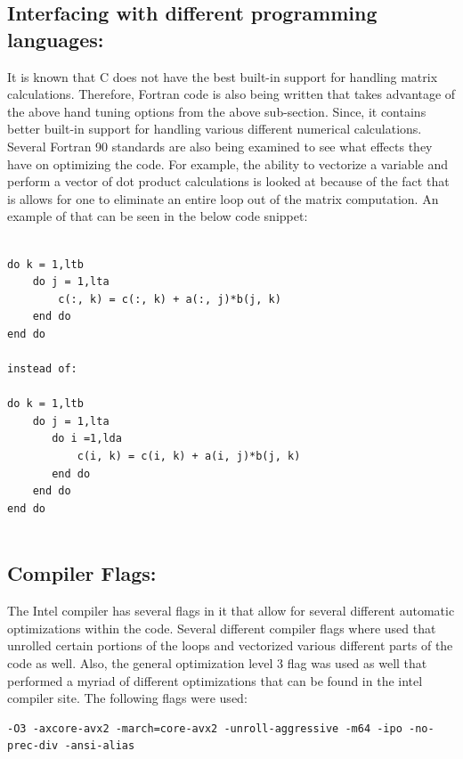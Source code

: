 \documentclass{article}
\begin{document}
\subsection*{Interfacing with different programming languages:}

It is known that C does not have the best built-in support for handling matrix calculations. Therefore, Fortran code is also being written that takes advantage of the above hand tuning options from the above sub-section. Since, it contains better built-in support for handling various different numerical calculations. Several Fortran 90 standards are also being examined to see what effects they have on optimizing the code. For example, the ability to vectorize a variable and perform a vector of dot product calculations is looked at because of the fact that is allows for one to eliminate an entire loop out of the matrix computation. An example of that can be seen in the below code snippet:
\begin{verbatim}

do k = 1,ltb
    do j = 1,lta
        c(:, k) = c(:, k) + a(:, j)*b(j, k)
    end do
end do

instead of:

do k = 1,ltb
    do j = 1,lta
       do i =1,lda
           c(i, k) = c(i, k) + a(i, j)*b(j, k)
       end do
    end do
end do


\end{verbatim}

\subsection*{Compiler Flags:}

The Intel compiler has several flags in it that allow for several different automatic optimizations within the code. Several different compiler flags where used that unrolled certain portions of the loops and vectorized various different parts of the code as well.  Also, the general optimization level 3 flag was used as well that performed a myriad of different optimizations that can be found in the intel compiler site. The following flags were used:

\begin{verbatim}
-O3 -axcore-avx2 -march=core-avx2 -unroll-aggressive -m64 -ipo -no-prec-div -ansi-alias
\end{verbatim}
\end{document}

